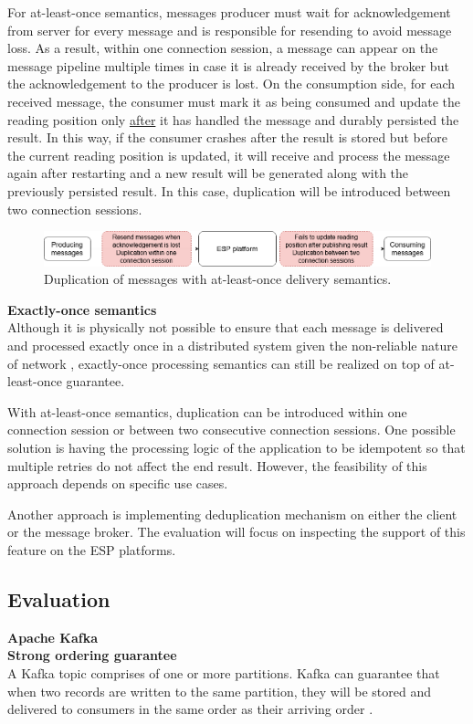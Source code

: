 For at-least-once semantics, messages producer must wait for acknowledgement from server for every message and is responsible for resending to avoid message loss. As a result, within one connection session, a message can appear on the message pipeline multiple times in case it is already received by the broker but the acknowledgement to the producer is lost. On the consumption side, for each received message, the consumer must mark it as being consumed and update the reading position only \underline{after} it has handled the message and durably persisted the result. In this way, if the consumer crashes after the result is stored but before the current reading position is updated, it will receive and process the message again after restarting and a new result will be generated along with the previously persisted result. In this case, duplication will be introduced between two connection sessions.
\begin{figure}[h]
	\centering
	\includegraphics[width=\linewidth]{images/at-least-once-duplication.png}
	\caption{Duplication of messages with at-least-once delivery semantics.}
	\label{fig:messageduplication}
\end{figure}

\textbf{Exactly-once semantics}\\
Although it is physically not possible to ensure that each message is delivered and processed exactly once in a distributed system given the non-reliable nature of network \cite{exactlyoncenotpossible}, exactly-once processing semantics can still be realized on top of at-least-once guarantee. 

With at-least-once semantics, duplication can be introduced within one connection session or between two consecutive connection sessions. One possible solution is having the processing logic of the application to be idempotent so that multiple retries do not affect the end result. However, the feasibility of this approach depends on specific use cases.

Another approach is implementing deduplication mechanism on either the client or the message broker. The evaluation will focus on inspecting the support of this feature on the ESP platforms. 

\subsection{Evaluation}
\large \textbf{Apache Kafka}\\
\normalsize
\textbf{Strong ordering guarantee}\\
A Kafka topic comprises of one or more partitions. Kafka can guarantee that when two records are written to the same partition, they will be stored and delivered to consumers in the same order as their arriving order \cite{kafkaconfluentintro}.

